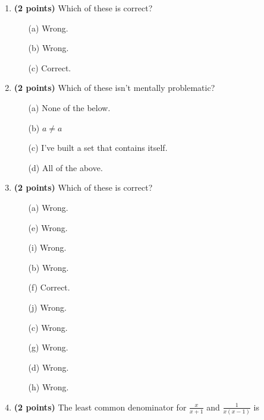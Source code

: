 \documentclass[12pt]{amsart}
\begin{document}
\newpage
\begin{enumerate}
\item {\bf (2 points)} 
 Which of these is correct?

\begin{minipage}[t]{1.0\linewidth}\begin{multicols}{3}\begin{itemize}\item[(a)]  Wrong. \item[(b)]  Wrong. \item[(c)]  Correct. \end{itemize}\end{multicols}\end{minipage} \vfill 
\item {\bf (2 points)} 
 Which of these isn't mentally problematic?

\begin{minipage}[t]{1.0\linewidth}\begin{itemize}\item[(a)]  None of the below.  \item[(b)]  $a \neq a$ \item[(c)]  I've built a set that contains itself. \item[(d)]   All of the above. \end{itemize}\end{minipage} \vfill 
\item {\bf (2 points)} 
 Which of these is correct?

\begin{minipage}[t]{1.0\linewidth}\begin{multicols}{4}\begin{itemize}\item[(a)]  Wrong. \item[(e)]  Wrong. \item[(i)]  Wrong. \item[(b)]  Wrong. \item[(f)]  Correct. \item[(j)]  Wrong. \item[(c)]  Wrong. \item[(g)]  Wrong. \item[] \item[(d)]  Wrong. \item[(h)]  Wrong. \item[] \end{itemize}\end{multicols}\end{minipage} \vfill 
\item {\bf (2 points)} 
 The least common denominator for $\displaystyle \frac{x}{x+1}$ and $\displaystyle \frac{1}{x(x-1)}$ is \vspace{.2cm}


\end{enumerate}
\end{document}
